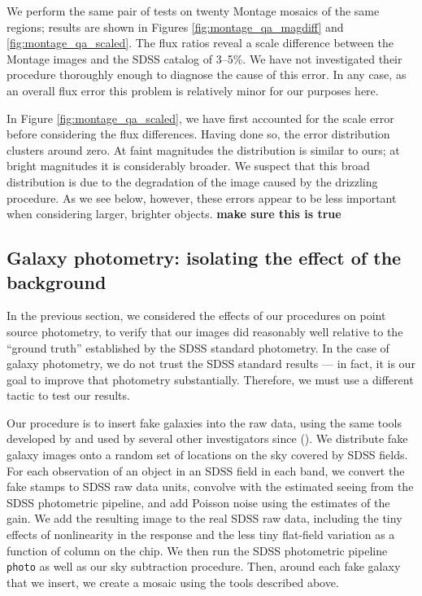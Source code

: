 \documentclass[10pt,preprint]{aastex}
\begin{document}
We perform the same pair of tests on twenty Montage mosaics of the
same regions; results are shown in Figures
\ref{fig:montage_qa_magdiff} and \ref{fig:montage_qa_scaled}.  The
flux ratios reveal a scale difference between the Montage
images and the SDSS catalog of 3--5\%.
We have not investigated their procedure thoroughly enough to diagnose
the cause of this error.  In any case, as an overall flux error this
problem is relatively minor for our purposes here.

In Figure \ref{fig:montage_qa_scaled}, we have first accounted for the
scale error before considering the flux differences. Having done so,
the error distribution clusters around zero.  At faint magnitudes the
distribution is similar to ours; at bright magnitudes it is
considerably broader. We suspect that this broad distribution is due
to the degradation of the image caused by the drizzling procedure. As
we see below, however, these errors appear to be less important when
considering larger, brighter objects. {\bf make sure this is true}

\subsection{Galaxy photometry: isolating the effect of the background}
\label{sec:simplegal}

In the previous section, we considered the effects of our procedures
on point source photometry, to verify that our images did reasonably
well relative to the ``ground truth'' established by the SDSS standard
photometry.  In the case of galaxy photometry, we do not trust the
SDSS standard results --- in fact, it is our goal to improve that
photometry substantially.  Therefore, we must use a different tactic
to test our results.

Our procedure is to insert fake galaxies into the raw data, using the
same tools developed by \citet{blanton05b} and used by several other
investigators since (\citealt{blanton04b, mandelbaum06a, masjedi06a}).
We distribute fake galaxy images onto a random set of locations on the
sky covered by SDSS fields. For each observation of an object in an
SDSS field in each band, we convert the fake stamps to SDSS raw data
units, convolve with the estimated seeing from the SDSS photometric
pipeline, and add Poisson noise using the estimates of the gain. We
add the resulting image to the real SDSS raw data, including the tiny
effects of nonlinearity in the response and the less tiny flat-field
variation as a function of column on the chip. We then run the SDSS
photometric pipeline {\tt photo} as well as our sky subtraction
procedure. Then, around each fake galaxy that we insert, we create a
mosaic using the tools described above.
\end{document}
